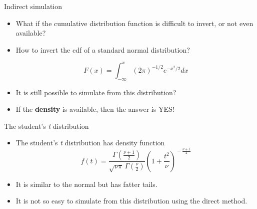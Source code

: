 \documentclass[10pt]{beamer}
\begin{document}
              \begin{frame}{Indirect simulation}
                \begin{itemize}
                \item What if the cumulative distribution function is difficult to invert, or not even available?

                \item How to invert the cdf of a standard normal distribution?

                  \begin{equation}
                    F(x)=\int_{-\infty}^{x}(2\pi)^{-1/2}e^{-x^2/2}dx
                  \end{equation}

                \item It is still possible to simulate from this distribution?

                \item If the {\bf density} is available, then the answer is YES!
                \end{itemize}
              \end{frame}



              \begin{frame}{The student's \emph{t} distribution}
                \begin{itemize}
                \item The student's \emph{t} distribution has density function
                  \begin{equation*}
                    f(t) = \frac{\Gamma(\frac{\nu+1}{2})} {\sqrt{\nu\pi}\,\Gamma(\frac{\nu}{2})} \left(1+\frac{t^2}{\nu} \right)^{\!-\frac{\nu+1}{2}}
                  \end{equation*}

                \item It is similar to the normal but has fatter tails.

                \item It is not so easy to simulate from this distribution using the
                  direct method.
                \end{itemize}
              \end{frame}
\end{document}
